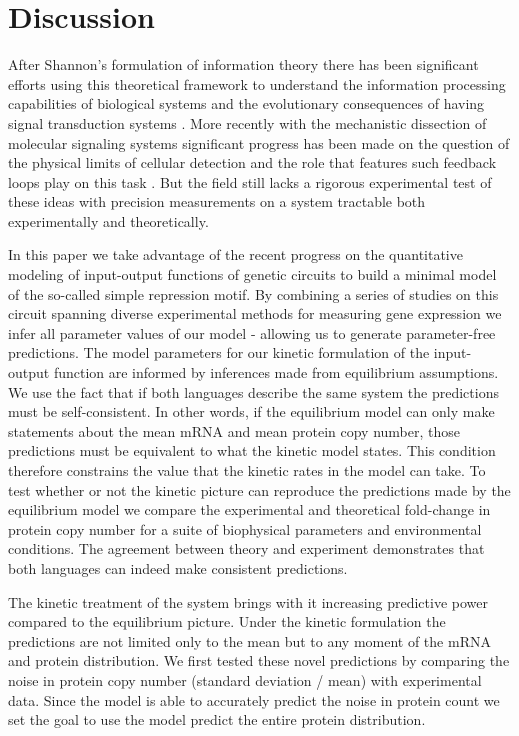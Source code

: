 \section*{Discussion}

After Shannon's formulation of information theory there has been significant
efforts using this theoretical framework to understand the information
processing capabilities of biological systems and the evolutionary consequences
of having signal transduction systems \cite{Bergstrom2004, Taylor2007a,
Tkacik2008, Polani2009, Nemenman2010, Rivoire2011}. More recently with the
mechanistic dissection of molecular signaling systems significant progress has
been made on the question of the physical limits of cellular detection and the
role that features such feedback loops play on this task \cite{Bialek2005,
Libby2007, Tkacik2011, Rhee2012a, Voliotis2014a}. But the field still lacks a
rigorous experimental test of these ideas with precision measurements on a
system tractable both experimentally and theoretically.

In this paper we take advantage of the recent progress on the quantitative
modeling of input-output functions of genetic circuits to build a minimal model
of the so-called simple repression motif. By combining a series of studies on
this circuit spanning diverse experimental methods for measuring gene expression
we infer all parameter values of our model - allowing us to generate
parameter-free predictions. The model parameters for our kinetic formulation of
the input-output function are informed by inferences made from equilibrium
assumptions. We use the fact that if both languages describe the same system the
predictions must be self-consistent. In other words, if the equilibrium model
can only make statements about the mean mRNA and mean protein copy number, those
predictions must be equivalent to what the kinetic model states. This condition
therefore constrains the value that the kinetic rates in the model can take. To
test whether or not the kinetic picture can reproduce the predictions made by
the equilibrium model we compare the experimental and theoretical fold-change in
protein copy number for a suite of biophysical parameters and environmental
conditions. The agreement between theory and experiment demonstrates that both
languages can indeed make consistent predictions.

The kinetic treatment of the system brings with it increasing predictive power
compared to the equilibrium picture. Under the kinetic formulation the
predictions are not limited only to the mean but to any moment of the mRNA and
protein distribution. We first tested these novel predictions by comparing the
noise in protein copy number (standard deviation / mean) with experimental data.
Since the model is able to accurately predict the noise in protein count we set
the goal to use the model predict the entire protein distribution.
